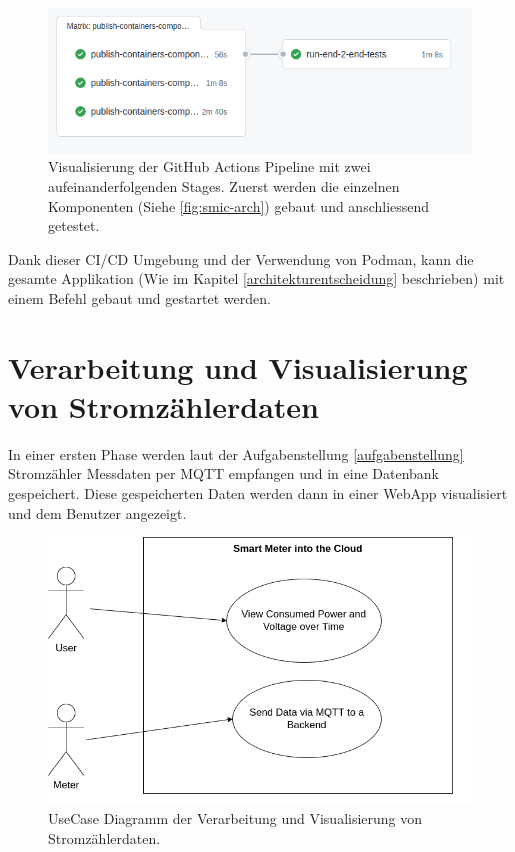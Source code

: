\begin{figure}[h]
    \centering
    \includegraphics[width=1.0\textwidth]{gfx/ci-env}
    \caption{
        Visualisierung der GitHub Actions Pipeline mit zwei aufeinanderfolgenden Stages.
        Zuerst werden die einzelnen Komponenten (Siehe \ref{fig:smic-arch}) gebaut und
        anschliessend getestet.
    }
    \label{fig:ci-env}
\end{figure}

Dank dieser \ac{CI/CD} Umgebung und der Verwendung von Podman, kann die gesamte Applikation
(Wie im Kapitel \ref{architekturentscheidung} beschrieben) mit einem
Befehl gebaut und gestartet werden.

\section{Verarbeitung und Visualisierung von Stromzählerdaten}

In einer ersten Phase werden laut der Aufgabenstellung \ref{aufgabenstellung} Stromzähler
Messdaten per \ac{MQTT} empfangen und in eine Datenbank gespeichert.
Diese gespeicherten Daten werden dann in einer WebApp visualisiert und dem Benutzer
angezeigt.

\begin{figure}[h]
    \centering
    \includegraphics[width=1.0\textwidth]{gfx/usecase1}
    \caption{
        UseCase Diagramm der Verarbeitung und Visualisierung von Stromzählerdaten.
    }
    \label{fig:usecase1}
\end{figure}

